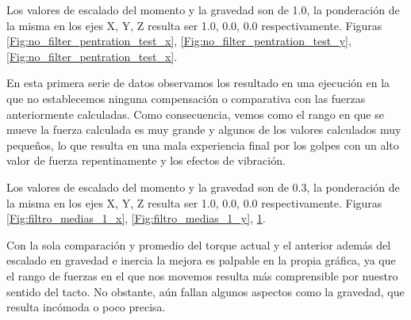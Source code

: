 Los valores de escalado del momento y la gravedad son de 1.0, la ponderación de la misma en los ejes X, Y, Z resulta ser 1.0, 0.0, 0.0 respectivamente. Figuras \ref{Fig:no_filter_pentration_test_x},  \ref{Fig:no_filter_pentration_test_y},  \ref{Fig:no_filter_pentration_test_x}.

En esta primera serie de datos observamos los resultado en una ejecución en la que no establecemos ninguna compensación o comparativa con las fuerzas anteriormente calculadas. Como consecuencia, vemos como el rango en que se mueve la fuerza calculada es muy grande y algunos de los valores calculados muy pequeños, lo que resulta en una mala experiencia final por los golpes con un alto valor de fuerza repentinamente y los efectos de vibración. 

\bigskip
\bigskip
\bigskip
\bigskip
\bigskip


\begin{figure}[!hbt]
   \begin{minipage}{0.33\textwidth}
     \centering
         \caption{}\label{Fig:filtro_medias_1_x}
   \end{minipage}\hfill
   \begin{minipage}{0.33\textwidth}
     \centering
         \caption{}\label{Fig:filtro_medias_1_y}
   \end{minipage}
   \begin{minipage}{0.33\textwidth}
     \centering
         \caption{}\label{Fig:filtro_medias_1_z}
   \end{minipage}\hfill
\end{figure}

Los valores de escalado del momento y la gravedad son de 0.3, la ponderación de la misma en los ejes X, Y, Z resulta ser 1.0, 0.0, 0.0 respectivamente. Figuras \ref{Fig:filtro_medias_1_x},  \ref{Fig:filtro_medias_1_y},  \ref{Fig:filtro_medias_1_z}.

Con la sola comparación y promedio del torque actual y el anterior además del escalado en gravedad e inercia la mejora es palpable en la propia gráfica, ya que el rango de fuerzas en el que nos movemos resulta más comprensible por nuestro sentido del tacto. No obstante, aún fallan algunos aspectos como la gravedad, que resulta incómoda o poco precisa.

